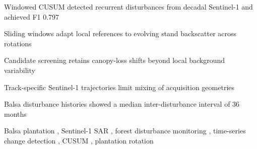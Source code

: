 \documentclass[a4paper,fleqn]{cas-sc}
\begin{document}
\begin{highlights}
  \item Windowed CUSUM detected recurrent disturbances from decadal Sentinel-1 and achieved F1 0.797

  \item Sliding windows adapt local references to evolving stand backscatter across rotations

  \item Candidate screening retains canopy-loss shifts beyond local background variability

  \item Track-specific Sentinel-1 trajectories limit mixing of acquisition geometries

  \item Balsa disturbance histories showed a median inter-disturbance interval of 36 months
\end{highlights}

\begin{keywords}
Balsa plantation \sep
Sentinel-1 SAR \sep
forest disturbance monitoring \sep
time-series change detection \sep
CUSUM \sep
plantation rotation
\end{keywords}

\maketitle
\doublespacing









\printcredits


\end{document}
